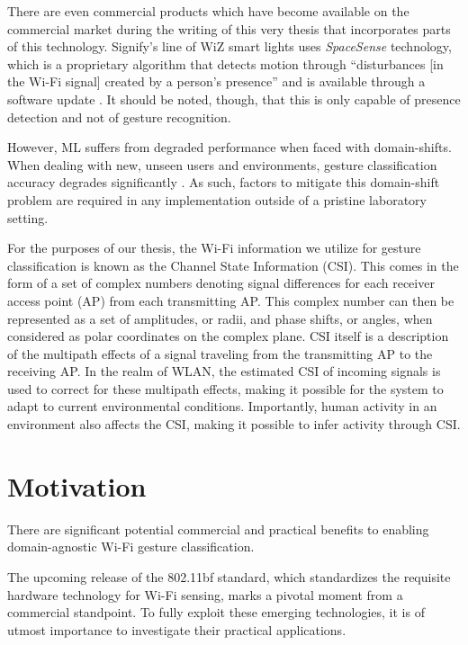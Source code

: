 There are even commercial products which have become available on the commercial market during the writing of this very thesis that incorporates parts of this technology. 
Signify's line of WiZ smart lights uses \textit{SpaceSense} technology, which is a proprietary algorithm that detects motion through ``disturbances [in the Wi-Fi signal] created by a person's presence'' and is available through a software update \cite{signify2023spacesense}.
It should be noted, though, that this is only capable of presence detection and not of gesture recognition.

However, ML suffers from degraded performance when faced with domain-shifts.
When dealing with new, unseen users and environments, gesture classification accuracy degrades significantly \cite{chetty2011through,adib2013see,pu2013whole,adib20143d,he2015wig,jiang2018towards,zheng2019zero,jiang2020wigan,ma2021location}.
As such, factors to mitigate this domain-shift problem are required in any implementation outside of a pristine laboratory setting.

For the purposes of our thesis, the Wi-Fi information we utilize for gesture classification is known as the Channel State Information (CSI).
This comes in the form of a set of complex numbers denoting signal differences for each receiver access point (AP) from each transmitting AP.
This complex number can then be represented as a set of amplitudes, or radii, and phase shifts, or angles, when considered as polar coordinates on the complex plane.
CSI itself is a description of the multipath effects of a signal traveling from the transmitting AP to the receiving AP.
In the realm of WLAN, the estimated CSI of incoming signals is used to correct for these multipath effects, making it possible for the system to adapt to current environmental conditions.
Importantly, human activity in an environment also affects the CSI, making it possible to infer activity through CSI.

\section{Motivation}\label{sec:intro-motivation}

There are significant potential commercial and practical benefits to enabling domain-agnostic Wi-Fi gesture classification.

The upcoming release of the 802.11bf standard, which standardizes the requisite hardware technology for Wi-Fi sensing, marks a pivotal moment from a commercial standpoint. To fully exploit these emerging technologies, it is of utmost importance to investigate their practical applications.

